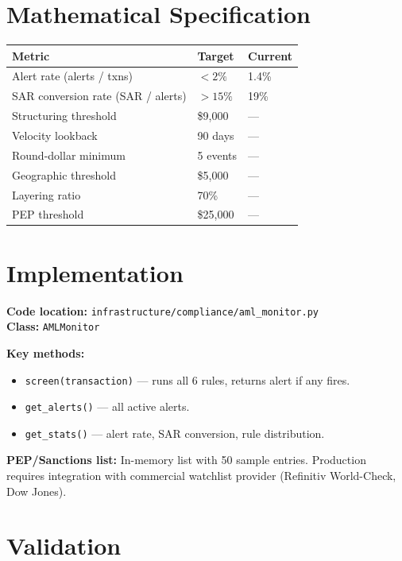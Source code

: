 \documentclass{apex_mdd}
\begin{document}
\section{Mathematical Specification}

\begin{center}
\small
\begin{tabular}{lll}
\toprule
\textbf{Metric} & \textbf{Target} & \textbf{Current} \\
\midrule
Alert rate (alerts / txns)            & $<2\%$   & 1.4\% \\
SAR conversion rate (SAR / alerts)    & $>15\%$  & 19\%  \\
Structuring threshold                 & \$9,000  & ---   \\
Velocity lookback                     & 90 days  & ---   \\
Round-dollar minimum                  & 5 events & ---   \\
Geographic threshold                  & \$5,000  & ---   \\
Layering ratio                        & 70\%     & ---   \\
PEP threshold                         & \$25,000 & ---   \\
\bottomrule
\end{tabular}
\end{center}

\section{Implementation}

\textbf{Code location:} \texttt{infrastructure/compliance/aml\_monitor.py}\\
\textbf{Class:} \texttt{AMLMonitor}

\textbf{Key methods:}
\begin{itemize}
  \item \texttt{screen(transaction)} --- runs all 6 rules, returns alert if any fires.
  \item \texttt{get\_alerts()} --- all active alerts.
  \item \texttt{get\_stats()} --- alert rate, SAR conversion, rule distribution.
\end{itemize}

\textbf{PEP/Sanctions list:} In-memory list with 50 sample entries. Production requires integration with commercial watchlist provider (Refinitiv World-Check, Dow Jones).

\section{Validation}
\end{document}
